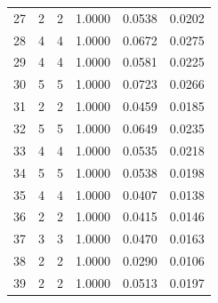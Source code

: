 {\begin{longtable}{rrrrrr}
27 & 2 & 2 & 1.0000 & 0.0538 & 0.0202\\
28 & 4 & 4 & 1.0000 & 0.0672 & 0.0275\\
29 & 4 & 4 & 1.0000 & 0.0581 & 0.0225\\
30 & 5 & 5 & 1.0000 & 0.0723 & 0.0266\\
31 & 2 & 2 & 1.0000 & 0.0459 & 0.0185\\
32 & 5 & 5 & 1.0000 & 0.0649 & 0.0235\\
33 & 4 & 4 & 1.0000 & 0.0535 & 0.0218\\
34 & 5 & 5 & 1.0000 & 0.0538 & 0.0198\\
35 & 4 & 4 & 1.0000 & 0.0407 & 0.0138\\
36 & 2 & 2 & 1.0000 & 0.0415 & 0.0146\\
37 & 3 & 3 & 1.0000 & 0.0470 & 0.0163\\
38 & 2 & 2 & 1.0000 & 0.0290 & 0.0106\\
39 & 2 & 2 & 1.0000 & 0.0513 & 0.0197\\
\bottomrule
\end{longtable}
}